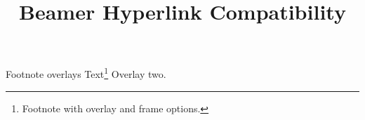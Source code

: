 \documentclass{impebeamer}
\title{Beamer Hyperlink Compatibility}
\begin{document}
\begin{frame}{Footnote overlays}
Text\footnote<2->[frame]{Footnote with overlay and frame options.}
\pause
Overlay two.
\end{frame}
\end{document}
